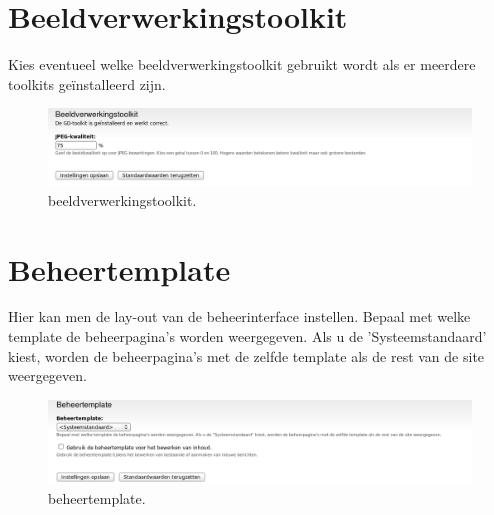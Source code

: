 \section{Beeldverwerkingstoolkit} 
Kies eventueel welke beeldverwerkingstoolkit gebruikt wordt als er meerdere
toolkits ge\"installeerd zijn. 
\begin{figure}[!h]
    \centering
   \includegraphics[scale=0.3,angle=0]{beeldverwerkingstoolkit}
   \caption{beeldverwerkingstoolkit.\label{white}}
 \end{figure}
 
\section{Beheertemplate} 
Hier kan men de lay-out van de beheerinterface instellen. Bepaal met
 welke template de beheerpagina's worden weergegeven. Als u de
 'Systeemstandaard' kiest, worden de beheerpagina's met de zelfde template als
 de rest van de site weergegeven.
\begin{figure}[!h]
    \centering
   \includegraphics[scale=0.3,angle=0]{beheertemplate}
   \caption{beheertemplate.\label{white}}
 \end{figure} 
 
 
